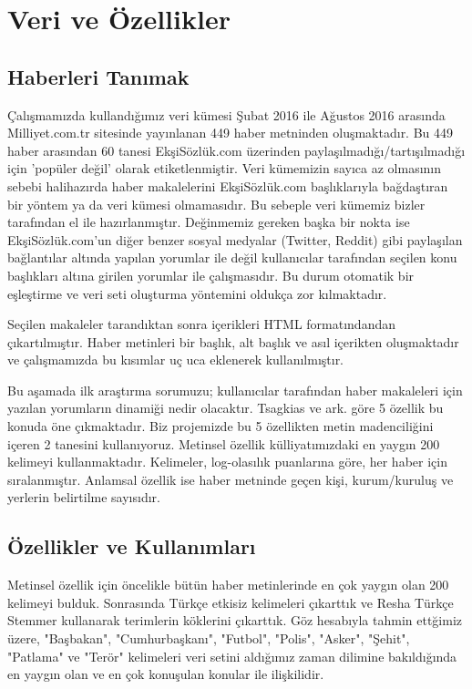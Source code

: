 \documentclass[conference]{IEEEtran}
\begin{document}
\section{Veri ve Özellikler}
\subsection{Haberleri Tanımak}
Çalışmamızda kullandığımız veri kümesi Şubat 2016 ile Ağustos 2016 arasında Milliyet.com.tr sitesinde yayınlanan 449 haber metninden oluşmaktadır. Bu 449 haber arasından 60 tanesi EkşiSözlük.com üzerinden paylaşılmadığı/tartışılmadığı için 'popüler değil' olarak etiketlenmiştir. Veri kümemizin sayıca az olmasının sebebi halihazırda haber makalelerini EkşiSözlük.com başlıklarıyla bağdaştıran bir yöntem ya da veri kümesi olmamasıdır. Bu sebeple veri kümemiz bizler tarafından el ile hazırlanmıştır. Değinmemiz gereken başka bir nokta ise EkşiSözlük.com'un diğer benzer sosyal medyalar (Twitter, Reddit) gibi paylaşılan bağlantılar altında yapılan yorumlar ile değil kullanıcılar tarafından seçilen konu başlıkları altına girilen yorumlar ile çalışmasıdır. Bu durum otomatik bir eşleştirme ve veri seti oluşturma yöntemini oldukça zor kılmaktadır.

Seçilen makaleler tarandıktan sonra içerikleri HTML formatındandan çıkartılmıştır. Haber metinleri bir başlık, alt başlık ve asıl içerikten oluşmaktadır ve çalışmamızda bu kısımlar uç uca eklenerek kullanılmıştır.

Bu aşamada ilk araştırma sorumuzu; kullanıcılar tarafından haber makaleleri için yazılan yorumların dinamiği nedir olacaktır. Tsagkias ve ark. \cite{tsagkias_predicting_2009} göre 5 özellik bu konuda öne çıkmaktadır. Biz projemizde bu 5 özellikten metin madenciliğini içeren 2 tanesini kullanıyoruz. Metinsel özellik külliyatımızdaki en yaygın 200 kelimeyi kullanmaktadır. Kelimeler, log-olasılık puanlarına göre, her haber için sıralanmıştır. Anlamsal özellik ise haber metninde geçen kişi, kurum/kuruluş ve yerlerin belirtilme sayısıdır.

\subsection{Özellikler ve Kullanımları}
Metinsel özellik için öncelikle bütün haber metinlerinde en çok yaygın olan 200 kelimeyi bulduk. Sonrasında Türkçe etkisiz kelimeleri çıkarttık ve Resha Türkçe Stemmer \cite{resha-turkish-stemmer} kullanarak terimlerin köklerini çıkarttık. Göz hesabıyla tahmin ettğimiz üzere, "Başbakan", "Cumhurbaşkanı", "Futbol", "Polis", "Asker", "Şehit", "Patlama" ve "Terör" kelimeleri veri setini aldığımız zaman dilimine bakıldığında en yaygın olan ve en çok konuşulan konular ile ilişkilidir.
\end{document}
